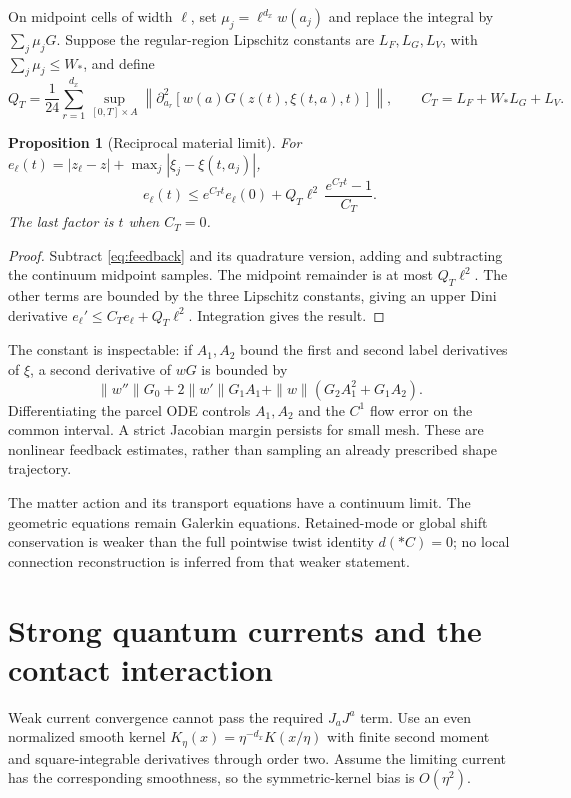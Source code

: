 \documentclass[11pt]{article}
\newtheorem{proposition}[theorem]{Proposition}
\begin{document}
On midpoint cells of width $\ell$, set $\mu_j=\ell^{d_x} w(a_j)$ and replace the integral by $\sum_j\mu_jG$. Suppose the regular-region Lipschitz constants are $L_F,L_G,L_V$, with $\sum_j\mu_j\le W_*$, and define
\[
Q_T=\frac1{24}\sum_{r=1}^{d_x}
\sup_{[0,T]\times A}
\left\|\partial_{a_r}^2\left[w(a)G(z(t),\xi(t,a),t)\right]\right\|,
\qquad C_T=L_F+W_*L_G+L_V.
\]
\begin{proposition}[Reciprocal material limit]\label{prop:quad}
For
$e_\ell(t)=|z_\ell-z|+\max_j|\xi_j-\xi(t,a_j)|$,
\begin{equation}\label{eq:quad}
\boxed{e_\ell(t)\le e^{C_Tt}e_\ell(0)
+Q_T\ell^2\,\frac{e^{C_Tt}-1}{C_T}.}
\end{equation}
The last factor is $t$ when $C_T=0$.
\end{proposition}
\begin{proof}
Subtract \eqref{eq:feedback} and its quadrature version, adding and subtracting the continuum midpoint samples. The midpoint remainder is at most $Q_T\ell^2$. The other terms are bounded by the three Lipschitz constants, giving an upper Dini derivative
$e_\ell'\le C_Te_\ell+Q_T\ell^2$. Integration gives the result.
\end{proof}
The constant is inspectable: if $A_1,A_2$ bound the first and second label derivatives of $\xi$, a second derivative of $wG$ is bounded by
\[
\|w''\|G_0+2\|w'\|G_1A_1
+\|w\|(G_2A_1^2+G_1A_2).
\]
Differentiating the parcel ODE controls $A_1,A_2$ and the $C^1$ flow error on the common interval. A strict Jacobian margin persists for small mesh. These are nonlinear feedback estimates, rather than sampling an already prescribed shape trajectory.

The matter action and its transport equations have a continuum limit. The geometric equations remain Galerkin equations. Retained-mode or global shift conservation is weaker than the full pointwise twist identity $d(*C)=0$; no local connection reconstruction is inferred from that weaker statement.

\section{Strong quantum currents and the contact interaction}
Weak current convergence cannot pass the required $J_aJ^a$ term. Use an even normalized smooth kernel
$K_\eta(x)=\eta^{-d_x}K(x/\eta)$ with finite second moment and square-integrable derivatives through order two.
Assume the limiting current has the corresponding smoothness, so the symmetric-kernel bias is $O(\eta^2)$.
\end{document}
